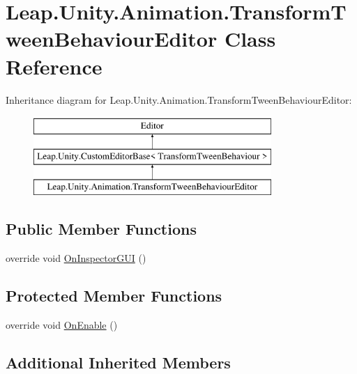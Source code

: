 \hypertarget{class_leap_1_1_unity_1_1_animation_1_1_transform_tween_behaviour_editor}{}\section{Leap.\+Unity.\+Animation.\+Transform\+Tween\+Behaviour\+Editor Class Reference}
\label{class_leap_1_1_unity_1_1_animation_1_1_transform_tween_behaviour_editor}
Inheritance diagram for Leap.\+Unity.\+Animation.\+Transform\+Tween\+Behaviour\+Editor\+:\begin{figure}[H]
\begin{center}
\leavevmode
\includegraphics[height=3.000000cm]{class_leap_1_1_unity_1_1_animation_1_1_transform_tween_behaviour_editor}
\end{center}
\end{figure}
\subsection*{Public Member Functions}
\begin{DoxyCompactItemize}
\item 
override void \mbox{\hyperlink{class_leap_1_1_unity_1_1_animation_1_1_transform_tween_behaviour_editor_ae11c6ea21c89d5a90e23db36a42722fc}{On\+Inspector\+G\+UI}} ()
\end{DoxyCompactItemize}
\subsection*{Protected Member Functions}
\begin{DoxyCompactItemize}
\item 
override void \mbox{\hyperlink{class_leap_1_1_unity_1_1_animation_1_1_transform_tween_behaviour_editor_a7880f5e858a7c97847651401e0185315}{On\+Enable}} ()
\end{DoxyCompactItemize}
\subsection*{Additional Inherited Members}


